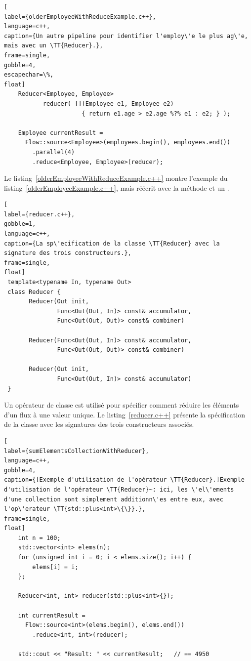 \label{reducer.sect}

\begin{lstlisting}[
label={olderEmployeeWithReduceExample.c++},
language=c++,
caption={Un autre pipeline pour identifier l'employ\'e le plus ag\'e, mais avec un \TT{Reducer}.},
frame=single,
gobble=4,
escapechar=\%,
float]
    Reducer<Employee, Employee> 
           reducer( [](Employee e1, Employee e2) 
                      { return e1.age > e2.age %?% e1 : e2; } );

    Employee currentResult =
      Flow::source<Employee>(employees.begin(), employees.end())
        .parallel(4)
        .reduce<Employee, Employee>(reducer);
\end{lstlisting}



Le listing~\ref{olderEmployeeWithReduceExample.c++} montre l'exemple du listing~\ref{olderEmployeeExample.c++}, mais r\'e\'ecrit avec la m\'ethode  et un .


\begin{lstlisting}[
label={reducer.c++},
gobble=1,
language=c++,
caption={La sp\'ecification de la classe \TT{Reducer} avec la signature des trois constructeurs.},
frame=single,
float]
 template<typename In, typename Out>
 class Reducer {
       Reducer(Out init, 
               Func<Out(Out, In)> const& accumulator,
               Func<Out(Out, Out)> const& combiner)

       Reducer(Func<Out(Out, In)> const& accumulator,
               Func<Out(Out, Out)> const& combiner)

       Reducer(Out init, 
               Func<Out(Out, In)> const& accumulator)
 }
\end{lstlisting}


Un op\'erateur de classe  est utilis\'e pour sp\'ecifier comment r\'eduire les \'el\'ements d'un flux \`a une valeur unique. Le listing~\ref{reducer.c++} présente la spécification  de la classe  avec les signatures des trois constructeurs associ\'es. 


\begin{lstlisting}[
label={sumElementsCollectionWithReducer},
language=c++,
gobble=4,
caption={[Exemple d'utilisation de l'opérateur \TT{Reducer}.]Exemple
d'utilisation de l'opérateur \TT{Reducer}~: ici, les \'el\'ements
d'une collection sont simplement additionn\'es entre eux, avec
l'op\'erateur \TT{std::plus<int>\{\}}.},
frame=single,
float]
    int n = 100;
    std::vector<int> elems(n);
    for (unsigned int i = 0; i < elems.size(); i++) {
        elems[i] = i;
    };

    Reducer<int, int> reducer(std::plus<int>{});

    int currentResult =
      Flow::source<int>(elems.begin(), elems.end())
        .reduce<int, int>(reducer);

	std::cout << "Result: " << currentResult;	// == 4950   
\end{lstlisting}


